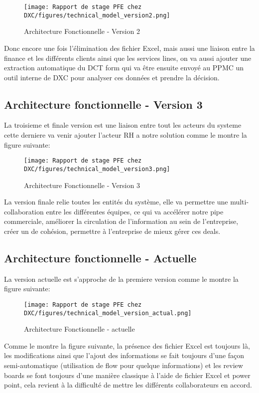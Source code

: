 \begin{figure}[!h]
    \centering
    \texttt{[image: Rapport de stage PFE chez DXC/figures/technical\_model\_version2.png]}
    \caption{Architecture Fonctionnelle - Version 2}
\end{figure}

Donc encore une fois l'élimination des fichier Excel, mais aussi une liaison entre la finance et les différents clients ainsi que les services lines, on va aussi ajouter une extraction automatique du DCT form qui va être ensuite envoyé au PPMC un outil interne de DXC pour analyser ces données et prendre la décision.

\newpage
\subsection{Architecture fonctionnelle - Version 3}
La troisieme et finale version est une liaison entre tout les acteurs du systeme cette derniere va venir ajouter l'acteur RH a notre solution comme le montre la figure suivante:

\begin{figure}[!h]
    \centering
    \texttt{[image: Rapport de stage PFE chez DXC/figures/technical\_model\_version3.png]}
    \caption{Architecture Fonctionnelle - Version 3}
\end{figure}

La version finale relie toutes les entités du système, elle va permettre une multi-collaboration entre les différentes équipes, ce qui va accélérer notre pipe commerciale, améliorer la circulation de l'information au sein de l'entreprise, créer un de cohésion, permettre à l'entreprise de mieux gérer ces deals.

\newpage
\subsection{Architecture fonctionnelle - Actuelle}

La version actuelle est s'approche de la premiere version comme le montre la figure suivante:

\begin{figure}[!h]
    \centering
    \texttt{[image: Rapport de stage PFE chez DXC/figures/technical\_model\_version\_actual.png]}
    \caption{Architecture Fonctionnelle - actuelle}
\end{figure}

Comme le montre la figure suivante, la présence des fichier Excel est toujours là, les modifications ainsi que l'ajout des informations se fait toujours d'une façon semi-automatique (utilisation de flow pour quelque informations) et les review boards se font toujours d'une manière classique à l'aide de fichier Excel et power point, cela revient à la difficulté de mettre les différents collaborateurs en accord.

